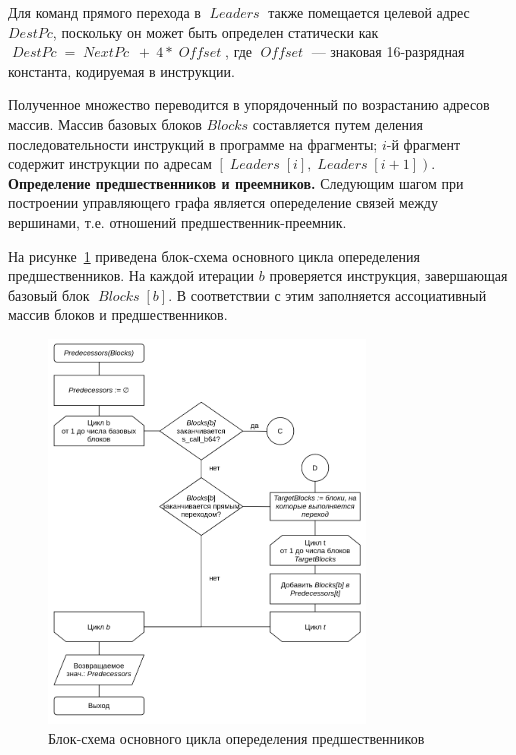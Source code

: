 \documentclass[a4paper,14pt]{extarticle}
\newcommand{\topic}[1]{\textbf{#1.}}
\newcommand{\var}[1]{\mathop{\mathit{#1}}}
\begin{document}
{Для команд прямого перехода в $\var{Leaders}$ также помещается целевой адрес $DestPc$,
поскольку он может быть определен статически как $\var{DestPc} = \var{NextPc}\ +\ 4*\var{Offset}$,
где $\var{Offset}$ — знаковая 16-разрядная константа, кодируемая в инструкции.

Полученное множество переводится в упорядоченный по возрастанию адресов массив.
Массив базовых блоков $Blocks$ составляется путем деления последовательности инструкций
в программе на фрагменты; $i$-й фрагмент содержит инструкции по адресам
$\left[\var{Leaders}[i], \var{Leaders}[i+1]\right)$.\\

\topic{Определение предшественников и преемников} Следующим шагом при построении
управляющего графа является опеределение связей между вершинами, т.е. отношений
предшественник-преемник.

На рисунке~\ref{fig:diagram-cfg} приведена блок-схема основного цикла
опеределения предшественников. На каждой итерации $b$ проверяется инструкция, завершающая
базовый блок $\var{Blocks}[b]$. В соответствии с этим заполняется ассоциативный массив
блоков и предшественников.

\begin{figure}[H]
\centering
\includegraphics[width=0.75\textwidth]{diagrams/alg-cfg}
\caption{Блок-схема основного цикла опеределения предшественников}
\label{fig:diagram-cfg}
\end{figure}

}
\end{document}
